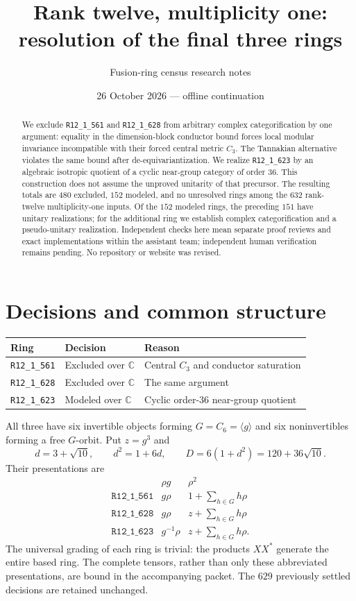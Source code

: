 \documentclass[11pt]{article}
\title{Rank twelve, multiplicity one:\\resolution of the final three rings}
\author{Fusion-ring census research notes}
\date{26 October 2026 --- offline continuation}
\newcommand{\R}[1]{\texttt{R12\_1\_#1}}
\newcommand{\C}{\mathbb C}
\begin{document}
\maketitle
\begin{abstract}
We exclude \R{561} and \R{628} from arbitrary complex categorification by
one argument: equality in the dimension-block conductor bound forces
local modular invariance incompatible with their forced central metric
$C_3$. The Tannakian alternative violates the same bound after
de-equivariantization. We realize \R{623} by an algebraic isotropic
quotient of a cyclic near-group category of order $36$. This construction
does not assume the unproved unitarity of that precursor. The resulting
totals are $480$ excluded, $152$ modeled, and no unresolved rings among
the $632$ rank-twelve multiplicity-one inputs. Of the $152$ modeled rings,
the preceding $151$ have unitary realizations; for the additional ring
we establish complex categorification and a pseudo-unitary realization.
Independent checks here mean separate proof reviews and exact
implementations within the assistant team; independent human verification
remains pending. No repository or website was revised.
\end{abstract}

\section{Decisions and common structure}
\begin{center}
\begin{tabular}{lll}\toprule
Ring & Decision & Reason\\\midrule
\R{561}&Excluded over $\C$&Central $C_3$ and conductor saturation\\
\R{628}&Excluded over $\C$&The same argument\\
\R{623}&Modeled over $\C$&Cyclic order-$36$ near-group quotient\\\bottomrule
\end{tabular}
\end{center}
All three have six invertible objects forming $G=C_6=\langle g\rangle$
and six noninvertibles forming a free $G$-orbit. Put $z=g^3$ and
\[
 d=3+\sqrt{10},\qquad d^2=1+6d,\qquad
 D=6(1+d^2)=120+36\sqrt{10}.
\]
Their presentations are
\[
\begin{array}{c|cc}
 &\rho g&\rho^2\\\hline
\R{561}&g\rho&1+\sum_{h\in G}h\rho\\
\R{628}&g\rho&z+\sum_{h\in G}h\rho\\
\R{623}&g^{-1}\rho&z+\sum_{h\in G}h\rho.
\end{array}
\]
The universal grading of each ring is trivial: the products $XX^*$
generate the entire based ring. The complete tensors, rather than only
these abbreviated presentations, are bound in the accompanying packet.
The $629$ previously settled decisions are retained unchanged.
\end{document}
